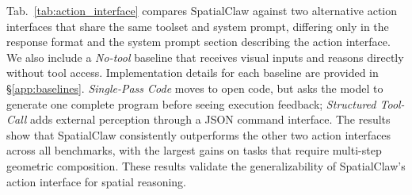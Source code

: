 \documentclass{llmxive}
\providecommand{\ours}{SpatialClaw}
\begin{document}
Tab.~\ref{tab:action_interface} compares \ours{} against two alternative action interfaces that share the same toolset and system prompt, differing only in the response format and the system prompt section describing the action interface. 
We also include a \emph{No-tool} baseline that receives visual inputs and reasons directly without tool access. Implementation details for each baseline are provided in \S\ref{app:baselines}.
\emph{Single-Pass Code} moves to open code, but asks the model to generate one complete program before seeing execution feedback;
\emph{Structured Tool-Call} adds external perception through a JSON command interface. The results show that \ours{} consistently outperforms the other two action interfaces across all benchmarks, with the largest gains on tasks that require multi-step geometric composition. 
These results validate the generalizability of \ours{}'s action interface for spatial reasoning. 
\end{document}
